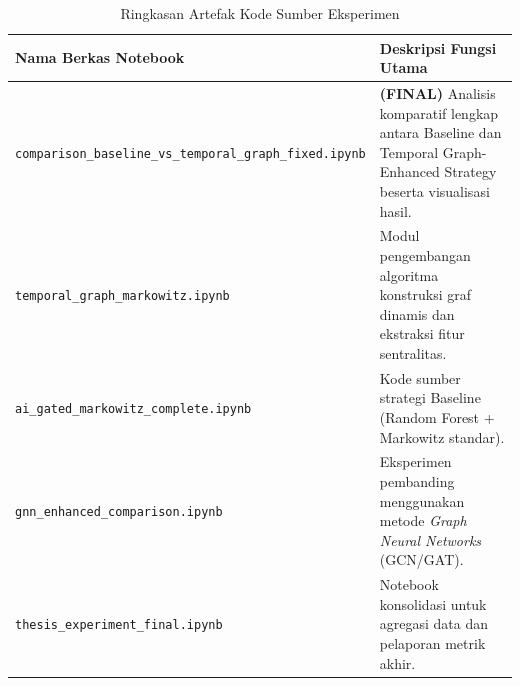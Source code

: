 \documentclass[a4paper,12pt]{article}
\begin{document}
\begin{table}[ht]
    \centering
    \caption{Ringkasan Artefak Kode Sumber Eksperimen}
    \label{tab:daftar_notebook}
    \renewcommand{\arraystretch}{1.5} %
    \begin{tabular}{|p{6.5cm}|p{8.5cm}|}
    \hline
    \textbf{Nama Berkas Notebook} & \textbf{Deskripsi Fungsi Utama} \\ \hline
    
    \texttt{comparison\_baseline\_vs\newline\_temporal\_graph\_fixed.ipynb} & 
    \textbf{(FINAL)} Analisis komparatif lengkap antara Baseline dan Temporal Graph-Enhanced Strategy beserta visualisasi hasil. \\ \hline
    
    \texttt{temporal\_graph\newline\_markowitz.ipynb} & 
    Modul pengembangan algoritma konstruksi graf dinamis dan ekstraksi fitur sentralitas. \\ \hline
    
    \texttt{ai\_gated\_markowitz\newline\_complete.ipynb} & 
    Kode sumber strategi Baseline (Random Forest + Markowitz standar). \\ \hline
    
    \texttt{gnn\_enhanced\newline\_comparison.ipynb} & 
    Eksperimen pembanding menggunakan metode \textit{Graph Neural Networks} (GCN/GAT). \\ \hline
    
    \texttt{thesis\_experiment\newline\_final.ipynb} & 
    Notebook konsolidasi untuk agregasi data dan pelaporan metrik akhir. \\ \hline
    \end{tabular}
\end{table}
\end{document}
